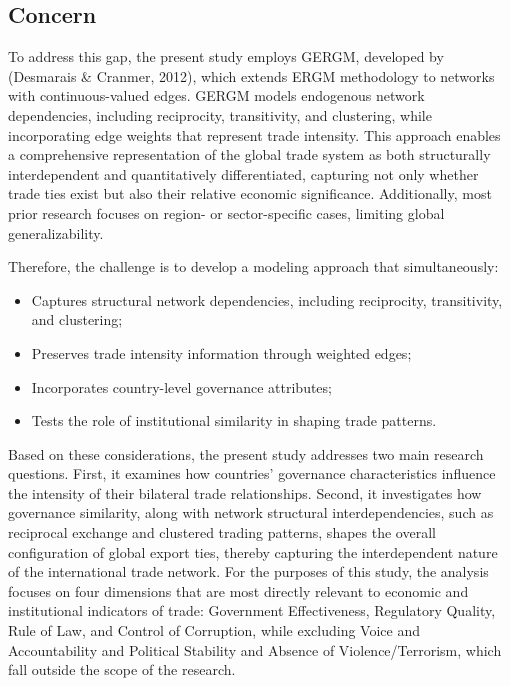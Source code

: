 \documentclass[
]{article}
\providecommand{\tightlist}{%
  \setlength{\itemsep}{0pt}\setlength{\parskip}{0pt}}
\begin{document}
\subsection{Concern}\label{concern}

To address this gap, the present study employs GERGM, developed by
(Desmarais \& Cranmer, 2012), which extends ERGM methodology to networks
with continuous-valued edges. GERGM models endogenous network
dependencies, including reciprocity, transitivity, and clustering, while
incorporating edge weights that represent trade intensity. This approach
enables a comprehensive representation of the global trade system as
both structurally interdependent and quantitatively differentiated,
capturing not only whether trade ties exist but also their relative
economic significance. Additionally, most prior research focuses on
region- or sector-specific cases, limiting global generalizability.

Therefore, the challenge is to develop a modeling approach that
simultaneously:

\begin{itemize}
\tightlist
\item
  Captures structural network dependencies, including reciprocity,
  transitivity, and clustering;
\item
  Preserves trade intensity information through weighted edges;
\item
  Incorporates country-level governance attributes;
\item
  Tests the role of institutional similarity in shaping trade patterns.
\end{itemize}

Based on these considerations, the present study addresses two main
research questions. First, it examines how countries' governance
characteristics influence the intensity of their bilateral trade
relationships. Second, it investigates how governance similarity, along
with network structural interdependencies, such as reciprocal exchange
and clustered trading patterns, shapes the overall configuration of
global export ties, thereby capturing the interdependent nature of the
international trade network. For the purposes of this study, the
analysis focuses on four dimensions that are most directly relevant to
economic and institutional indicators of trade: Government
Effectiveness, Regulatory Quality, Rule of Law, and Control of
Corruption, while excluding Voice and Accountability and Political
Stability and Absence of Violence/Terrorism, which fall outside the
scope of the research.
\end{document}
